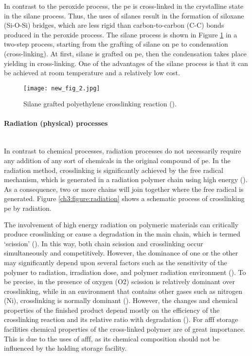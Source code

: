 In contrast to the peroxide process, the \acrshort{pe} is cross-linked in the crystalline state in the silane process. Thus, the uses of silanes result in the formation of siloxane (Si-O-Si) bridges, which are less rigid than carbon-to-carbon (C-C) bonds produced in the peroxide process. The silane process is shown in Figure \ref{ch3:figure:reaction} in a two-step process, starting from the grafting of silane on \acrshort{pe} to condensation (cross-linking). At first, silane is grafted on \acrshort{pe}, then the condensation takes place yielding in cross-linking. One of the advantages of the silane process is that it can be achieved at room temperature and a relatively low cost.

\begin{figure}[H]
\captionsetup[subfigure]{justification=raggedright}
\centering
\texttt{[image: new\_fig\_2.jpg]}
\caption{Silane grafted polyethylene crosslinking reaction (\cite{kurtz2009cross}).}
\label{ch3:figure:reaction}
\end{figure}

\paragraph{Radiation (physical) processes} \hfill \\
In contrast to chemical processes, radiation processes do not necessarily require any addition of any sort of chemicals in the original compound of \acrshort{pe}. In the radiation method, crosslinking is significantly achieved by the free radical mechanism, which is generated in a radiation polymer chain using high energy (\cite{peacock2000handbook}). As a consequence, two or more chains will join together where the free radical is generated. Figure \ref{ch3:figure:radiation} shows a schematic process of crosslinking \acrshort{pe} by radiation.

The involvement of high energy radiation on polymeric materials can critically produce crosslinking or cause a degradation in the main chain, which is termed ‘scission’ (\cite{meola2005cross}). In this way, both chain scission and crosslinking occur simultaneously and competitively. However, the dominance of one or the other may significantly depend upon several factors such as the sensitivity of the polymer to radiation, irradiation dose, and polymer radiation environment (\cite{meola2005cross}). To be precise, in the presence of oxygen (O2) scission is relatively dominant over crosslinking, while in an environment that contains other gases such as nitrogen (Ni), crosslinking is normally dominant (\cite{peacock2000handbook}). However, the changes and chemical properties of the finished product depend mostly on the efficiency of the crosslinking reaction and its relative ratio with degradation (\cite{meola2005cross}). For \acrshort{afff} storage facilities chemical properties of the cross-linked polymer are of great importance. This is due to the uses of \acrshort{afff}, as its chemical composition should not be influenced by the holding storage facility.

